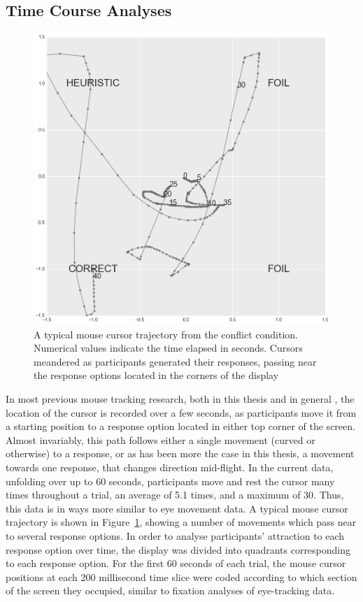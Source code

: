
\subsection{Time Course Analyses}

\begin{figure}[ht]
  \centering
  \includegraphics[width=\figurewidth]{imgs/exp6-typical-trajectory.png}
  \caption[A typical cursor trajectory from Experiment 6.]{
    \label{fig:exp6-typical-trajectory}
    A typical mouse cursor trajectory from the conflict condition. 
    Numerical values indicate the time elapsed in seconds. 
    Cursors meandered as participants generated their responses, 
    passing near the response options located in the corners of the display
  }
\end{figure}

In most previous mouse tracking research,
both in this thesis and in general
\citep[e.g.][]{Freeman2011d,Spivey2005},
the location of the cursor is recorded over a few seconds,
as participants move it from a starting position to 
a response option located in either top corner of the screen.
Almost invariably, this path follows either a single movement
(curved or otherwise) to a response,
or as has been more the case in this thesis,
a movement towards one response, that changes direction mid-flight.
In the current data, unfolding over up to 60 seconds, 
participants move and rest the cursor many times throughout a trial,
an average of 5.1 times, and a maximum of 30.
Thus, this data is in ways more similar to eye movement data.
A typical mouse cursor trajectory is shown in Figure~\ref{fig:exp6-typical-trajectory},
showing  a number of movements which pass near to several response options. 
In order to analyse participants' attraction to each response option over time,
the display was divided into quadrants
corresponding to each response option.
For the first 60 seconds of each trial, 
the mouse cursor positions at each 200 millisecond time slice
were coded according to which section of the screen they occupied, 
similar to fixation analyses of eye-tracking data.

